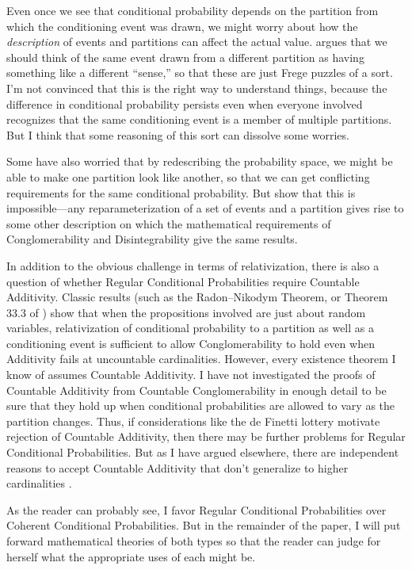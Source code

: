 Even once we see that conditional probability depends on the partition from which the conditioning event was drawn, we might worry about how the \emph{description} of events and partitions can affect the actual value. \citet{rescorlaborel} argues that we should think of the same event drawn from a different partition as having something like a different ``sense,'' so that these are just Frege puzzles of a sort. I'm not convinced that this is the right way to understand things, because the difference in conditional probability persists even when everyone involved recognizes that the same conditioning event is a member of multiple partitions. But I think that some reasoning of this sort can dissolve some worries.

Some have also worried that by redescribing the probability space, we might be able to make one partition look like another, so that we can get conflicting requirements for the same conditional probability. But \citet{redeiborel} show that this is impossible---any reparameterization of a set of events and a partition gives rise to some other description on which the mathematical requirements of Conglomerability and Disintegrability give the same results.

In addition to the obvious challenge in terms of relativization, there is also a question of whether Regular Conditional Probabilities require Countable Additivity. Classic results (such as the Radon--Nikodym Theorem, or Theorem 33.3 of \citealp{billingsley}) show that when the propositions involved are just about random variables, relativization of conditional probability to a partition as well as a conditioning event is sufficient to allow Conglomerability to hold even when Additivity fails at uncountable cardinalities. However, every existence theorem I know of assumes Countable Additivity. I have not investigated the proofs of Countable Additivity from Countable Conglomerability in enough detail to be sure that they hold up when conditional probabilities are allowed to vary as the partition changes. Thus, if considerations like the de Finetti lottery motivate rejection of Countable Additivity, then there may be further problems for Regular Conditional Probabilities. But as I have argued elsewhere, there are independent reasons to accept Countable Additivity that don't generalize to higher cardinalities \citep{whycount}.

As the reader can probably see, I favor Regular Conditional Probabilities over Coherent Conditional Probabilities. But in the remainder of the paper, I will put forward mathematical theories of both types so that the reader can judge for herself what the appropriate uses of each might be.


